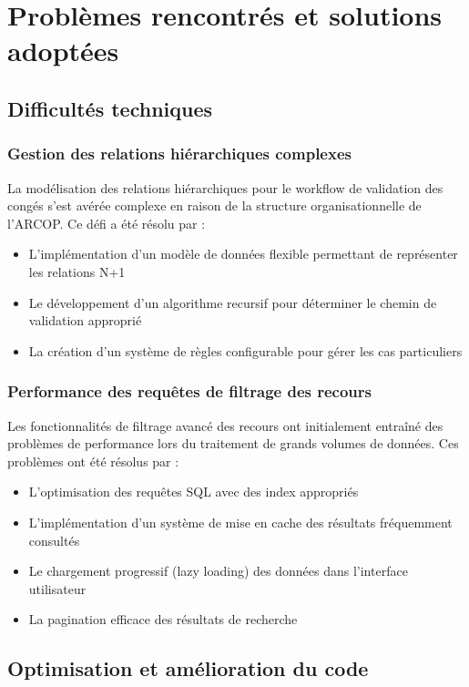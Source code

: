 \section{Problèmes rencontrés et solutions adoptées}

\subsection{Difficultés techniques}

\subsubsection{Gestion des relations hiérarchiques complexes}
La modélisation des relations hiérarchiques pour le workflow de validation des congés s'est avérée complexe en raison de la structure organisationnelle de l'ARCOP. Ce défi a été résolu par :

\begin{itemize}
    \item L'implémentation d'un modèle de données flexible permettant de représenter les relations N+1
    \item Le développement d'un algorithme recursif pour déterminer le chemin de validation approprié
    \item La création d'un système de règles configurable pour gérer les cas particuliers
\end{itemize}

\subsubsection{Performance des requêtes de filtrage des recours}
Les fonctionnalités de filtrage avancé des recours ont initialement entraîné des problèmes de performance lors du traitement de grands volumes de données. Ces problèmes ont été résolus par :

\begin{itemize}
    \item L'optimisation des requêtes SQL avec des index appropriés
    \item L'implémentation d'un système de mise en cache des résultats fréquemment consultés
    \item Le chargement progressif (lazy loading) des données dans l'interface utilisateur
    \item La pagination efficace des résultats de recherche
\end{itemize}

\subsection{Optimisation et amélioration du code}

